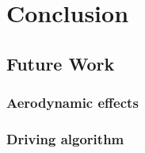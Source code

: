 \chapter{Conclusion}
\label{chap:conclusion}
\section{Future Work}
\label{sec:future}
\subsection{Aerodynamic effects}
\subsection{Driving algorithm}

